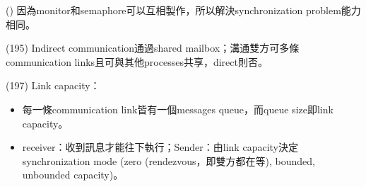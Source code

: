 \begin{theorem}{()} 因為monitor和semaphore可以互相製作，所以解決synchronization problem能力相同。
\end{theorem}

\begin{theorem}{(195)} Indirect communication通過shared mailbox；溝通雙方可多條communication links且可與其他processes共享，direct則否。
\end{theorem}

\begin{theorem}{(197)} Link capacity：\begin{itemize}
        \item 每一條communication link皆有一個messages queue，而queue size即link capacity。
        \item receiver：收到訊息才能往下執行；Sender：由link capacity決定synchronization mode (zero (rendezvous，即雙方都在等), bounded, unbounded capacity)。
    \end{itemize}
\end{theorem}
